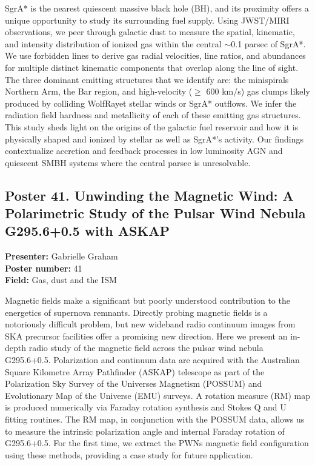 SgrA* is the nearest quiescent massive black hole (BH), and its proximity offers a unique opportunity to study its surrounding fuel supply. Using JWST/MIRI observations, we peer through galactic dust to measure the spatial, kinematic, and intensity distribution of ionized gas within the central $\sim$0.1 parsec of SgrA*. We use forbidden lines to derive gas radial velocities, line ratios, and abundances for multiple distinct kinematic components that overlap along the line of sight. The three dominant emitting structures that we identify are: the minispirals Northern Arm, the Bar region, and high-velocity ($\geq$ 600 km/s) gas clumps likely produced by colliding WolfRayet stellar winds or SgrA* outflows. We infer the radiation field hardness and metallicity of each of these emitting gas structures. This study sheds light on the origins of the galactic fuel reservoir and how it is physically shaped and ionized by stellar as well as SgrA*'s activity. Our findings contextualize accretion and feedback processes in low luminosity AGN and quiescent SMBH systems where the central parsec is unresolvable.

\hypertarget{poster-abstract-talk-77}{}\label{poster-abstract-page-talk-77}
\subsection*{Poster 41. Unwinding the Magnetic Wind: A Polarimetric Study of the Pulsar Wind Nebula G295.6+0.5 with ASKAP}
\textbf{Presenter:} Gabrielle Graham\\
\textbf{Poster number:} 41\\
\textbf{Field:} Gas, dust and the ISM

Magnetic fields make a significant but poorly understood contribution to the energetics of supernova remnants. Directly probing magnetic fields is a notoriously difficult problem, but new wideband radio continuum images from SKA precursor facilities offer a promising new direction. Here we present an in-depth radio study of the magnetic field across the pulsar wind nebula G295.6+0.5. Polarization and continuum data are acquired with the Australian Square Kilometre Array Pathfinder (ASKAP) telescope as part of the Polarization Sky Survey of the Universes Magnetism (POSSUM) and Evolutionary Map of the Universe (EMU) surveys. A rotation measure (RM) map is produced numerically via Faraday rotation synthesis and Stokes Q and U fitting routines. The RM map, in conjunction with the POSSUM data, allows us to measure the intrinsic polarization angle and internal Faraday rotation of G295.6+0.5. For the first time, we extract the PWNs magnetic field configuration using these methods, providing a case study for future application.

